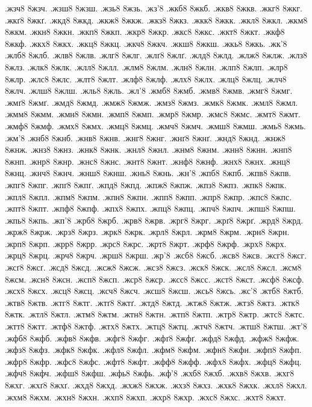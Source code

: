 {.жзч8
8жзч.
.жзш8
8жзш.
.жзь8
8жзь.
.жз'8
.жкб8
8жкб.
.жкв8
8жкв.
.жкг8
8жкг.
.жкґ8
8жкґ.
.жкд8
8жкд.
.жкж8
8жкж.
.жкз8
8жкз.
.жкк8
8жкк.
.жкл8
8жкл.
.жкм8
8жкм.
.жкн8
8жкн.
.жкп8
8жкп.
.жкр8
8жкр.
.жкс8
8жкс.
.жкт8
8жкт.
.жкф8
8жкф.
.жкх8
8жкх.
.жкц8
8жкц.
.жкч8
8жкч.
.жкш8
8жкш.
.жкь8
8жкь.
.жк'8
.жлб8
8жлб.
.жлв8
8жлв.
.жлг8
8жлг.
.жлґ8
8жлґ.
.жлд8
8жлд.
.жлж8
8жлж.
.жлз8
8жлз.
.жлк8
8жлк.
.жлл8
8жлл.
.жлм8
8жлм.
.жлн8
8жлн.
.жлп8
8жлп.
.жлр8
8жлр.
.жлс8
8жлс.
.жлт8
8жлт.
.жлф8
8жлф.
.жлх8
8жлх.
.жлц8
8жлц.
.жлч8
8жлч.
.жлш8
8жлш.
.жль8
8жль.
.жл'8
.жмб8
8жмб.
.жмв8
8жмв.
.жмг8
8жмг.
.жмґ8
8жмґ.
.жмд8
8жмд.
.жмж8
8жмж.
.жмз8
8жмз.
.жмк8
8жмк.
.жмл8
8жмл.
.жмм8
8жмм.
.жмн8
8жмн.
.жмп8
8жмп.
.жмр8
8жмр.
.жмс8
8жмс.
.жмт8
8жмт.
.жмф8
8жмф.
.жмх8
8жмх.
.жмц8
8жмц.
.жмч8
8жмч.
.жмш8
8жмш.
.жмь8
8жмь.
.жм'8
.жнб8
8жнб.
.жнв8
8жнв.
.жнг8
8жнг.
.жнґ8
8жнґ.
.жнд8
8жнд.
.жнж8
8жнж.
.жнз8
8жнз.
.жнк8
8жнк.
.жнл8
8жнл.
.жнм8
8жнм.
.жнн8
8жнн.
.жнп8
8жнп.
.жнр8
8жнр.
.жнс8
8жнс.
.жнт8
8жнт.
.жнф8
8жнф.
.жнх8
8жнх.
.жнц8
8жнц.
.жнч8
8жнч.
.жнш8
8жнш.
.жнь8
8жнь.
.жн'8
.жпб8
8жпб.
.жпв8
8жпв.
.жпг8
8жпг.
.жпґ8
8жпґ.
.жпд8
8жпд.
.жпж8
8жпж.
.жпз8
8жпз.
.жпк8
8жпк.
.жпл8
8жпл.
.жпм8
8жпм.
.жпн8
8жпн.
.жпп8
8жпп.
.жпр8
8жпр.
.жпс8
8жпс.
.жпт8
8жпт.
.жпф8
8жпф.
.жпх8
8жпх.
.жпц8
8жпц.
.жпч8
8жпч.
.жпш8
8жпш.
.жпь8
8жпь.
.жп'8
.жрб8
8жрб.
.жрв8
8жрв.
.жрг8
8жрг.
.жрґ8
8жрґ.
.жрд8
8жрд.
.жрж8
8жрж.
.жрз8
8жрз.
.жрк8
8жрк.
.жрл8
8жрл.
.жрм8
8жрм.
.жрн8
8жрн.
.жрп8
8жрп.
.жрр8
8жрр.
.жрс8
8жрс.
.жрт8
8жрт.
.жрф8
8жрф.
.жрх8
8жрх.
.жрц8
8жрц.
.жрч8
8жрч.
.жрш8
8жрш.
.жр'8
.жсб8
8жсб.
.жсв8
8жсв.
.жсг8
8жсг.
.жсґ8
8жсґ.
.жсд8
8жсд.
.жсж8
8жсж.
.жсз8
8жсз.
.жск8
8жск.
.жсл8
8жсл.
.жсм8
8жсм.
.жсн8
8жсн.
.жсп8
8жсп.
.жср8
8жср.
.жсс8
8жсс.
.жст8
8жст.
.жсф8
8жсф.
.жсх8
8жсх.
.жсц8
8жсц.
.жсч8
8жсч.
.жсш8
8жсш.
.жсь8
8жсь.
.жс'8
.жтб8
8жтб.
.жтв8
8жтв.
.жтг8
8жтг.
.жтґ8
8жтґ.
.жтд8
8жтд.
.жтж8
8жтж.
.жтз8
8жтз.
.жтк8
8жтк.
.жтл8
8жтл.
.жтм8
8жтм.
.жтн8
8жтн.
.жтп8
8жтп.
.жтр8
8жтр.
.жтс8
8жтс.
.жтт8
8жтт.
.жтф8
8жтф.
.жтх8
8жтх.
.жтц8
8жтц.
.жтч8
8жтч.
.жтш8
8жтш.
.жт'8
.жфб8
8жфб.
.жфв8
8жфв.
.жфг8
8жфг.
.жфґ8
8жфґ.
.жфд8
8жфд.
.жфж8
8жфж.
.жфз8
8жфз.
.жфк8
8жфк.
.жфл8
8жфл.
.жфм8
8жфм.
.жфн8
8жфн.
.жфп8
8жфп.
.жфр8
8жфр.
.жфс8
8жфс.
.жфт8
8жфт.
.жфф8
8жфф.
.жфх8
8жфх.
.жфц8
8жфц.
.жфч8
8жфч.
.жфш8
8жфш.
.жфь8
8жфь.
.жф'8
.жхб8
8жхб.
.жхв8
8жхв.
.жхг8
8жхг.
.жхґ8
8жхґ.
.жхд8
8жхд.
.жхж8
8жхж.
.жхз8
8жхз.
.жхк8
8жхк.
.жхл8
8жхл.
.жхм8
8жхм.
.жхн8
8жхн.
.жхп8
8жхп.
.жхр8
8жхр.
.жхс8
8жхс.
.жхт8
8жхт.
}
